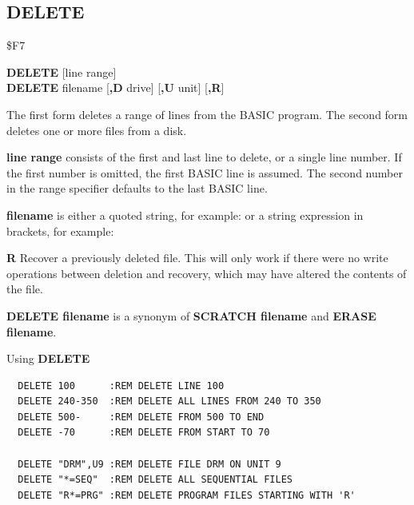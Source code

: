 \subsection{DELETE}
\begin{description}[leftmargin=2cm,style=nextline]
\item [Token:] \$F7
\item [Format:] {\bf DELETE} [line range] \\
                {\bf DELETE} filename [{\bf,D} drive] [{\bf,U} unit] [{\bf,R}]
\item [Usage:] The first form deletes
               a range of lines from the BASIC program.
               The second form deletes one or more files from a disk.

               {\bf line range} consists of the first and last
               line to delete, or a single line number.
               If the first number is omitted, the
               first BASIC line is assumed.
               The second number in the range specifier defaults
               to the last BASIC line.

   {\bf filename} is either a quoted string, for example:  or
   a string expression in brackets, for example: 

   \drivedefinition

   \unitdefinition

   {\bf R} Recover a previously deleted file.
   This will only work if there were no write operations
   between deletion and recovery, which may have altered the
   contents of the file.

\item [Remarks:] {\bf DELETE filename} is a synonym of {\bf SCRATCH filename}
                 and {\bf ERASE filename}.

\item [Examples:] Using {\bf DELETE}
\begin{tcolorbox}[colback=black,coltext=white]
\verbatimfont{\codefont}
\begin{verbatim}
  DELETE 100      :REM DELETE LINE 100
  DELETE 240-350  :REM DELETE ALL LINES FROM 240 TO 350
  DELETE 500-     :REM DELETE FROM 500 TO END
  DELETE -70      :REM DELETE FROM START TO 70

  DELETE "DRM",U9 :REM DELETE FILE DRM ON UNIT 9
  DELETE "*=SEQ"  :REM DELETE ALL SEQUENTIAL FILES
  DELETE "R*=PRG" :REM DELETE PROGRAM FILES STARTING WITH 'R'
\end{verbatim}
\end{tcolorbox}
\end{description}

